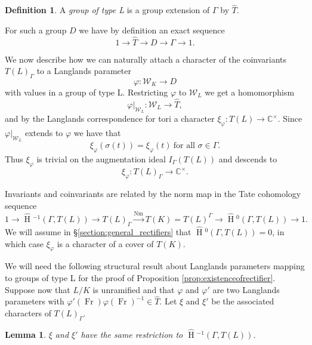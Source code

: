 \documentclass{compositio}
\theoremstyle{plain}
\newtheorem{lemma}[theorem]{Lemma}
\newcommand{\HT}[1]{\hat{\HH}{}^{#1}}
\theoremstyle{definition}
\newtheorem{definition}[theorem]{Definition}
\DeclareMathOperator{\HH}{H}
\DeclareMathOperator{\Nm}{Nm}
\DeclareMathOperator{\Fr}{Fr}
\newcommand{\CCx}{\mathbb{C}^\times}
\newcommand{\Weil}{\mathcal{W}}
\begin{document}
\begin{definition}
A \emph{group of type L} is a group extension of $\Gamma$ by $\hat{T}$.
\end{definition}

For such a group $D$ we have by definition an exact sequence
$$1 \rightarrow \hat{T} \rightarrow D \rightarrow \Gamma \rightarrow 1.$$

We now describe how we can naturally attach a character of the coinvariants
$T(L)_{\Gamma}$ to a Langlands parameter
$$\varphi : \Weil_K \rightarrow D$$
with values in a group of type L.
Restricting $\varphi$ to $\Weil_L$ we get a homomorphism
$$\varphi|_{\Weil_L} : \Weil_L \rightarrow \hat{T},$$
and by the Langlands correspondence for tori a character
$\xi_{\varphi} : T(L) \rightarrow \CCx$.  Since $\varphi|_{\Weil_L}$ extends
to $\varphi$ we have that
$$\xi_{\varphi}(\sigma(t)) = \xi_{\varphi}(t)\ \mbox{for all $\sigma \in \Gamma$.}$$
Thus $\xi_{\varphi}$ is trivial on the augmentation ideal $I_{\Gamma}(T(L))$
and descends to $$\xi_{\varphi} : T(L)_\Gamma \rightarrow \CCx.$$

Invariants
and coinvariants are related by the norm map
in the Tate cohomology sequence
$$1 \rightarrow \HT{-1}(\Gamma,T(L)) \rightarrow T(L)_{\Gamma} \xrightarrow{\Nm} T(K)
  = T(L)^{\Gamma} \rightarrow \HT{0}(\Gamma,T(L)) \rightarrow 1.$$
We will assume in \S \ref{section:general_rectifiers} that $\HT{0}(\Gamma,T(L)) = 0$, in which case
$\xi_\varphi$ is a character of a cover of $T(K)$.

We will need the following structural result about Langlands
parameters mapping to groups of type L for the proof of
Proposition \ref{prop:existenceofrectifier}.  Suppose now that $L/K$ is unramified and that
$\varphi$ and $\varphi'$ are two Langlands parameters
with $\varphi'(\Fr) \varphi(\Fr)^{-1} \in \hat{T}$.
Let $\xi$ and $\xi'$ be the associated characters of $T(L)_{\Gamma}$.

\begin{lemma} \label{lem:toral_modification}
$\xi$ and $\xi'$ have the same restriction to $\HT{-1}(\Gamma, T(L))$.
\end{lemma}
\end{document}
